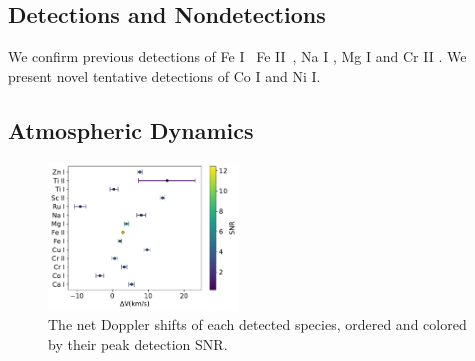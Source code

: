 \documentclass[twocolumn]{aastex631}
\begin{document}
        

        \subsection{Detections and Nondetections}\label{subsec:Detections}
        We confirm previous detections of Fe I~\citep{Nugroho2020, Rainer2021} Fe II~\citep{CasasayasBarris2020, Hoeijmakers2020, BelloArufe2022}, Na I \citep{CasasayasBarris2020, Hoeijmakers2020, Nugroho2020, Sicilia2022}, Mg I \citep{Hoeijmakers2020} and Cr II \citep{Hoeijmakers2020}. We present novel tentative detections of Co I and Ni I.

        

        
                


        

        \subsection{Atmospheric Dynamics}\label{subsec:Atmospheric Dynamics}
            

        
        \begin{figure}[]\label{fig:combined-species-snr} 
            \includegraphics[width=0.45\textwidth]{plots-updated/KELT-20b.inverted-transmission-better.CombinedRVs.pdf}
            \caption{The net Doppler shifts of each detected species, ordered and colored by their peak detection SNR.}
            
        \end{figure}
\end{document}
